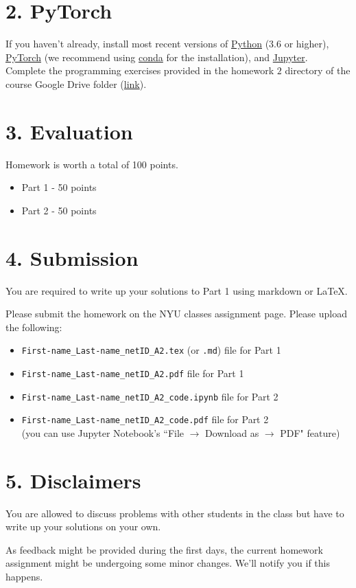 \documentclass[12pt,letterpaper]{article}
\newcommand\hwnumber{2}                  %
\begin{document}
\newpage
\section*{2. PyTorch}
If you haven't already, install most recent versions of 
\href{https://www.python.org/downloads/}{Python} (3.6 or higher), \href{https://pytorch.org/}{PyTorch} (we recommend using \href{https://conda.io/projects/conda/en/latest/user-guide/install/index.html}{conda} for the installation), and \href{https://jupyter.org/install.html}{Jupyter}.\\

\noindent Complete the programming exercises provided in the homework $\hwnumber$ directory of the course Google Drive folder (\href{https://drive.google.com/drive/u/2/folders/1aYUXkJxdoNayK9xEo5IODbuxP1gMdSds}{link}).

\section*{3. Evaluation}
Homework is worth a total of 100 points.
\begin{itemize}
    \item Part 1 - 50 points
    \item Part 2 - 50 points
\end{itemize}


\section*{4. Submission}
You are required to write up your solutions to Part 1 using markdown or \LaTeX.

Please submit the homework on the NYU classes assignment page. Please upload the following:
\begin{itemize}
    \item \texttt{First-name\_Last-name\_netID\_A2.tex} (or \texttt{.md}) file for Part 1
    \item \texttt{First-name\_Last-name\_netID\_A2.pdf} file for Part 1
    \item \texttt{First-name\_Last-name\_netID\_A2\_code.ipynb} file for Part 2
    \item 
    \texttt{First-name\_Last-name\_netID\_A2\_code.pdf} file for Part 2\\
    (you can use Jupyter Notebook's ``File $\to$ Download as $\to$ PDF" feature)
\end{itemize}

\section*{5. Disclaimers}
You are allowed to discuss problems with other students in the class but have to write up your solutions on your own. 

As feedback might be provided during the first days, the current homework assignment might be undergoing some minor changes. We'll notify you if this happens.
\end{document}
